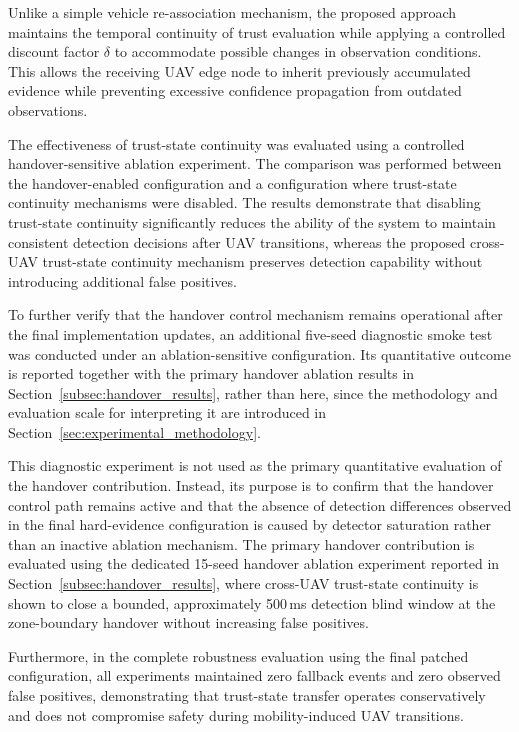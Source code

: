\documentclass[journal]{IEEEtran}
\begin{document}
Unlike a simple vehicle re-association mechanism, the proposed approach maintains the temporal continuity of trust evaluation while applying a controlled discount factor $\delta$ to accommodate possible changes in observation conditions. This allows the receiving UAV edge node to inherit previously accumulated evidence while preventing excessive confidence propagation from outdated observations.

The effectiveness of trust-state continuity was evaluated using a controlled handover-sensitive ablation experiment. The comparison was performed between the handover-enabled configuration and a configuration where trust-state continuity mechanisms were disabled. The results demonstrate that disabling trust-state continuity significantly reduces the ability of the system to maintain consistent detection decisions after UAV transitions, whereas the proposed cross-UAV trust-state continuity mechanism preserves detection capability without introducing additional false positives.

To further verify that the handover control mechanism remains operational
after the final implementation updates, an additional five-seed diagnostic
smoke test was conducted under an ablation-sensitive configuration. Its
quantitative outcome is reported together with the primary handover
ablation results in Section~\ref{subsec:handover_results}, rather than
here, since the methodology and evaluation scale for interpreting it are
introduced in Section~\ref{sec:experimental_methodology}.

This diagnostic experiment is not used as the primary quantitative evaluation
of the handover contribution. Instead, its purpose is to confirm that the
handover control path remains active and that the absence of detection
differences observed in the final hard-evidence configuration is caused by
detector saturation rather than an inactive ablation mechanism. The primary
handover contribution is evaluated using the dedicated 15-seed handover
ablation experiment reported in Section~\ref{subsec:handover_results}, where cross-UAV trust-state
continuity is shown to close a bounded, approximately 500\,ms detection
blind window at the zone-boundary handover without increasing false
positives.

Furthermore, in the complete robustness evaluation using the final patched configuration, all experiments maintained zero fallback events and zero observed false positives, demonstrating that trust-state transfer operates conservatively and does not compromise safety during mobility-induced UAV transitions.
\end{document}
